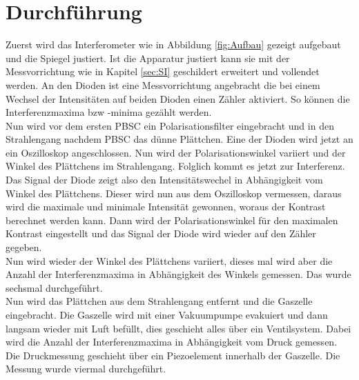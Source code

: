 \section{Durchführung}
\label{sec:Durchführung}
Zuerst wird das Interferometer wie in Abbildung \ref{fig:Aufbau} gezeigt aufgebaut und die Spiegel justiert. 
Ist die Apparatur justiert kann sie mit der Messvorrichtung wie in Kapitel \ref{sec:SI} geschildert erweitert 
und vollendet werden. An den Dioden ist eine Messvorrichtung angebracht die bei einem Wechsel der Intensitäten 
auf beiden Dioden einen Zähler aktiviert. So können die Interferenzmaxima bzw -minima gezählt werden.\\ 
Nun wird vor dem ersten PBSC ein Polarisationsfilter eingebracht und in den Strahlengang nachdem PBSC 
das dünne Plättchen. Eine der Dioden wird jetzt an ein Oszilloskop angeschlossen. Nun wird der 
Polarisationswinkel variiert und der Winkel des Plättchens im Strahlengang. Folglich kommt es jetzt zur 
Interferenz. Das Signal der Diode zeigt also den Intensitätswechel in Abhängigkeit vom 
Winkel des Plättchens. Dieser wird nun aus dem Oszilloskop vermessen, daraus wird die maximale und minimale 
Intensität gewonnen, woraus der Kontrast berechnet werden kann. Dann wird der Polarisationswinkel für 
den maximalen Kontrast eingestellt und das Signal der Diode wird wieder auf den Zähler gegeben. \\
Nun wird wieder der Winkel des Plättchens variiert, dieses mal wird aber die Anzahl der 
Interferenzmaxima in Abhängigkeit des Winkels gemessen. Das wurde sechsmal durchgeführt. \\
Nun wird das Plättchen aus dem Strahlengang entfernt und die Gaszelle eingebracht. 
Die Gaszelle wird mit einer Vakuumpumpe evakuiert und dann langsam wieder mit Luft befüllt, dies 
geschieht alles über ein Ventilsystem. Dabei wird die Anzahl der Interferenzmaxima in Abhängigkeit vom 
Druck gemessen. Die Druckmessung geschieht über ein Piezoelement innerhalb der Gaszelle. Die Messung wurde 
viermal durchgeführt.
